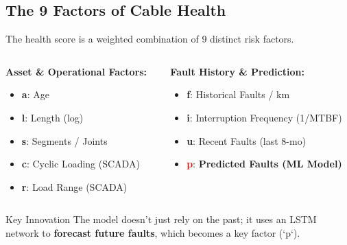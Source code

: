 \documentclass[a4paper,11pt]{article}
\begin{document}
\subsection{The 9 Factors of Cable Health}
The health score is a weighted combination of 9 distinct risk factors.
\begin{columns}
    \begin{column}{0.5\textwidth}
        \textbf{Asset \& Operational Factors:}
        \begin{itemize}
            \item \textbf{a}: Age
            \item \textbf{l}: Length (log)
            \item \textbf{s}: Segments / Joints
            \item \textbf{c}: Cyclic Loading (SCADA)
            \item \textbf{r}: Load Range (SCADA)
        \end{itemize}
    \end{column}
    \begin{column}{0.5\textwidth}
        \textbf{Fault History \& Prediction:}
        \begin{itemize}
            \item \textbf{f}: Historical Faults / km
            \item \textbf{i}: Interruption Frequency (1/MTBF)
            \item \textbf{u}: Recent Faults (last 8-mo)
            \item \textbf{\textcolor{red}{p}}: \textbf{Predicted Faults (ML Model)}
        \end{itemize}
    \end{column}
\end{columns}
\begin{alertblock}{Key Innovation}
    The model doesn't just rely on the past; it uses an LSTM network to \textbf{forecast future faults}, which becomes a key factor (`p`).
\end{alertblock}
\end{document}
